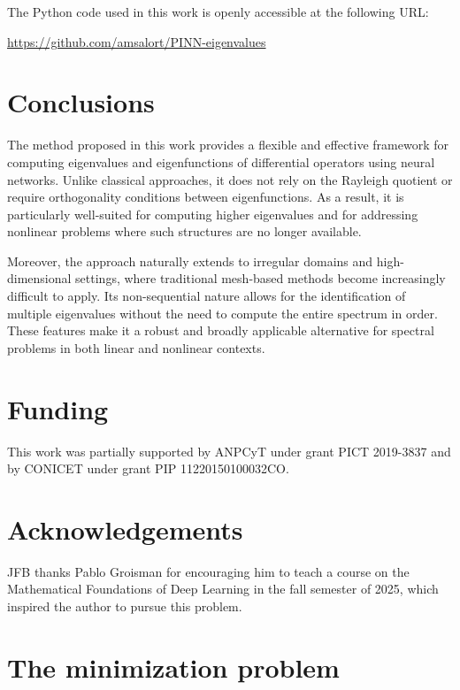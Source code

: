 \documentclass[11pt]{amsart}
\theoremstyle{definition}
\theoremstyle{remark}
\theoremstyle{plain}
\begin{document}
The Python code used in this work is openly accessible at the following URL:
\begin{center}
\url{https://github.com/amsalort/PINN-eigenvalues}
\end{center}

\section{Conclusions}

The method proposed in this work provides a flexible and effective framework for computing eigenvalues and eigenfunctions of differential operators using neural networks. Unlike classical approaches, it does not rely on the Rayleigh quotient or require orthogonality conditions between eigenfunctions. As a result, it is particularly well-suited for computing higher eigenvalues and for addressing nonlinear problems where such structures are no longer available.

Moreover, the approach naturally extends to irregular domains and high-dimensional settings, where traditional mesh-based methods become increasingly difficult to apply. Its non-sequential nature allows for the identification of multiple eigenvalues without the need to compute the entire spectrum in order. These features make it a robust and broadly applicable alternative for spectral problems in both linear and nonlinear contexts.

\section*{Funding}

This work was partially supported by ANPCyT under grant PICT 2019-3837 and by CONICET under grant PIP 11220150100032CO.

\section*{Acknowledgements}

JFB thanks Pablo Groisman for encouraging him to teach a course on the Mathematical Foundations of Deep Learning in the fall semester of 2025, which inspired the author to pursue this problem.


\appendix

\section{The minimization problem}
\end{document}
